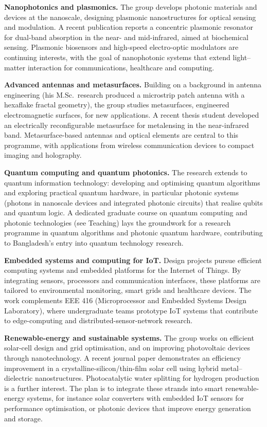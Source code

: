 \begin{cvblock}
\textbf{Nanophotonics and plasmonics.} The group develops photonic materials and devices at the nanoscale, designing plasmonic nanostructures for optical sensing and modulation. A recent publication reports a concentric plasmonic resonator for dual-band absorption in the near- and mid-infrared, aimed at biochemical sensing. Plasmonic biosensors and high-speed electro-optic modulators are continuing interests, with the goal of nanophotonic systems that extend light--matter interaction for communications, healthcare and computing.

\textbf{Advanced antennas and metasurfaces.} Building on a background in antenna engineering (his M.Sc.\ research produced a microstrip patch antenna with a hexaflake fractal geometry), the group studies metasurfaces, engineered electromagnetic surfaces, for new applications. A recent thesis student developed an electrically reconfigurable metasurface for metalensing in the near-infrared band. Metasurface-based antennas and optical elements are central to this programme, with applications from wireless communication devices to compact imaging and holography.

\textbf{Quantum computing and quantum photonics.} The research extends to quantum information technology: developing and optimising quantum algorithms and exploring practical quantum hardware, in particular photonic systems (photons in nanoscale devices and integrated photonic circuits) that realise qubits and quantum logic. A dedicated graduate course on quantum computing and photonic technologies (see Teaching) lays the groundwork for a research programme in quantum algorithms and photonic quantum hardware, contributing to Bangladesh's entry into quantum technology research.

\textbf{Embedded systems and computing for IoT.} Design projects pursue efficient computing systems and embedded platforms for the Internet of Things. By integrating sensors, processors and communication interfaces, these platforms are tailored to environmental monitoring, smart grids and healthcare devices. The work complements EEE 416 (Microprocessor and Embedded Systems Design Laboratory), where undergraduate teams prototype IoT systems that contribute to edge-computing and distributed-sensor-network research.

\textbf{Renewable-energy and sustainable systems.} The group works on efficient solar-cell design and grid optimisation, and on improving photovoltaic devices through nanotechnology. A recent journal paper demonstrates an efficiency improvement in a crystalline-silicon/thin-film solar cell using hybrid metal--dielectric nanostructures. Photocatalytic water splitting for hydrogen production is a further interest. The plan is to integrate these strands into smart renewable-energy systems, for instance solar converters with embedded IoT sensors for performance optimisation, or photonic devices that improve energy generation and storage.
\end{cvblock}
\fi

